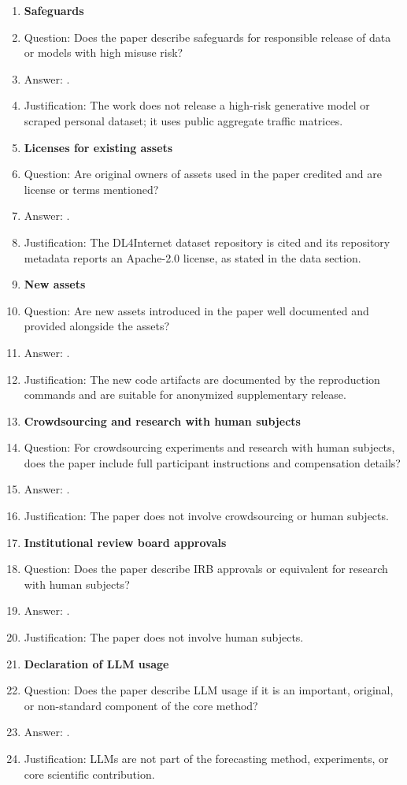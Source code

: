 \documentclass{article}
\begin{document}
\begin{enumerate}
\item {\bf Safeguards}
    \item[] Question: Does the paper describe safeguards for responsible release of data or models with high misuse risk?
    \item[] Answer: \answerNA{}.
    \item[] Justification: The work does not release a high-risk generative model or scraped personal dataset; it uses public aggregate traffic matrices.

\item {\bf Licenses for existing assets}
    \item[] Question: Are original owners of assets used in the paper credited and are license or terms mentioned?
    \item[] Answer: \answerYes{}.
    \item[] Justification: The DL4Internet dataset repository is cited and its repository metadata reports an Apache-2.0 license, as stated in the data section.

\item {\bf New assets}
    \item[] Question: Are new assets introduced in the paper well documented and provided alongside the assets?
    \item[] Answer: \answerYes{}.
    \item[] Justification: The new code artifacts are documented by the reproduction commands and are suitable for anonymized supplementary release.

\item {\bf Crowdsourcing and research with human subjects}
    \item[] Question: For crowdsourcing experiments and research with human subjects, does the paper include full participant instructions and compensation details?
    \item[] Answer: \answerNA{}.
    \item[] Justification: The paper does not involve crowdsourcing or human subjects.

\item {\bf Institutional review board approvals}
    \item[] Question: Does the paper describe IRB approvals or equivalent for research with human subjects?
    \item[] Answer: \answerNA{}.
    \item[] Justification: The paper does not involve human subjects.

\item {\bf Declaration of LLM usage}
    \item[] Question: Does the paper describe LLM usage if it is an important, original, or non-standard component of the core method?
    \item[] Answer: \answerNA{}.
    \item[] Justification: LLMs are not part of the forecasting method, experiments, or core scientific contribution.
\end{enumerate}
\end{document}
